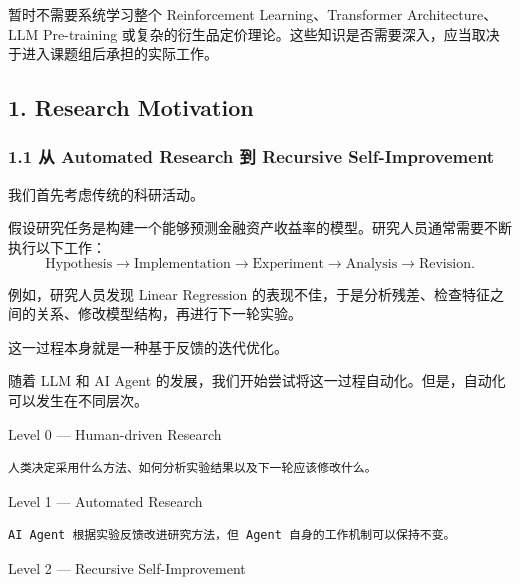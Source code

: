 暂时不需要系统学习整个 Reinforcement Learning、Transformer Architecture、LLM Pre-training 或复杂的衍生品定价理论。这些知识是否需要深入，应当取决于进入课题组后承担的实际工作。

\hypertarget{part-1-07-0001-research-motivation}{%
\subsection{1. Research Motivation}\label{part-1-07-0001-research-motivation}}

\hypertarget{part-1-07-0001-ux4ece-automated-research-ux5230-recursive-self-improvement}{%
\subsubsection{1.1 从 Automated Research 到 Recursive Self-Improvement}\label{part-1-07-0001-ux4ece-automated-research-ux5230-recursive-self-improvement}}

我们首先考虑传统的科研活动。

假设研究任务是构建一个能够预测金融资产收益率的模型。研究人员通常需要不断执行以下工作：
\[\text{Hypothesis}
\longrightarrow
\text{Implementation}
\longrightarrow
\text{Experiment}
\longrightarrow
\text{Analysis}
\longrightarrow
\text{Revision}.\]

例如，研究人员发现 Linear Regression 的表现不佳，于是分析残差、检查特征之间的关系、修改模型结构，再进行下一轮实验。

这一过程本身就是一种基于反馈的迭代优化。

随着 LLM 和 AI Agent 的发展，我们开始尝试将这一过程自动化。但是，自动化可以发生在不同层次。

Level 0 --- Human-driven Research


\begin{verbatim}
人类决定采用什么方法、如何分析实验结果以及下一轮应该修改什么。
\end{verbatim}

Level 1 --- Automated Research


\begin{verbatim}
AI Agent 根据实验反馈改进研究方法，但 Agent 自身的工作机制可以保持不变。
\end{verbatim}

Level 2 --- Recursive Self-Improvement


